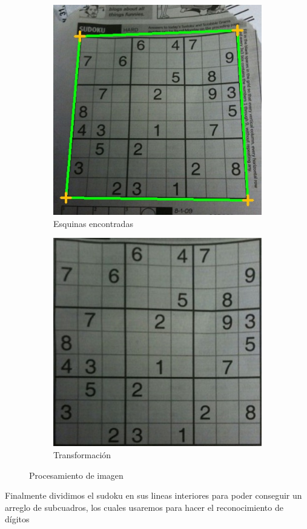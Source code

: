 \documentclass{article}
\begin{document}
\begin{figure}[H]
\centering
\begin{subfigure}{.5\textwidth}
  \centering
  \includegraphics[width=.6\linewidth]{esquinas}
  \caption{Esquinas encontradas}
  \label{fig:sub1}
\end{subfigure}%
\begin{subfigure}{.5\textwidth}
  \centering
  \includegraphics[width=.6\linewidth]{transform}
  \caption{Transformaci\'on}
  \label{fig:sub2}
\end{subfigure}
\caption{Procesamiento de imagen}
\label{fig:test}
\end{figure}

Finalmente dividimos el sudoku en sus lineas interiores para poder conseguir
un arreglo de subcuadros, los cuales usaremos para hacer el reconocimiento de 
d\'igitos
\end{document}
